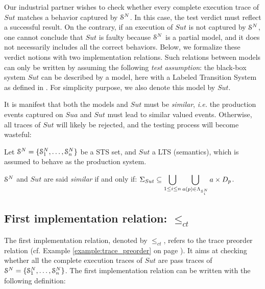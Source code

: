 Our industrial partner wishes to check whether every complete
execution trace of $\mathit{Sut}$ matches a behavior captured by
$\EuScript{S}^{N}$. In this case, the test verdict must reflect a
successful result. On the contrary, if an execution of
$\mathit{Sut}$ is not captured by $\EuScript{S}^{N}$, one cannot
conclude that $\mathit{Sut}$ is faulty because $\EuScript{S}^{N}$
is a partial model, and it does not necessarily includes all the
correct behaviors. Below, we formalize these verdict notions
with two implementation relations. Such relations between models
can only be written by assuming the following \emph{test
assumption}: the black-box system $\mathit{Sut}$ can be described
by a model, here with a Labeled Transition System as defined in
. For
simplicity purpose, we also denote this model by $\mathit{Sut}$.

It is manifest that both the models and $\mathit{Sut}$ must be
\emph{similar}, \emph{i.e.} the production events captured on
$\mathit{Sua}$ and $\mathit{Sut}$ must lead to similar valued
events. Otherwise, all traces of $\mathit{Sut}$ will likely be
rejected, and the testing process will become wasteful:

\begin{definition}
    Let $\EuScript{S}^N = \{ \EuScript{S}_1^N, \dots,
    \EuScript{S}_n^N \}$ be a STS set, and $\mathit{Sut}$ a LTS
    (semantics), which is assumed to behave as the production
    system.

    $\EuScript{S}^N$ and $\mathit{Sut}$ are said \emph{similar}
    if and only if: $\displaystyle\Sigma_{Sut} \subseteq \bigcup_{1 \leq i \leq n}
    \bigcup_{a(p) \in \Lambda_{\EuScript{S}_i^N}} a \times D_p$.

    \label{def:similar-sut-sua}
\end{definition}

\subsection{First implementation relation: $\leq_{ct}$}

The first implementation relation, denoted by $\leq_{ct}$, refers
to the trace preorder relation
\cite{DNH84,vaandrager1991relationship} (cf. Example
\ref{example:trace_preorder} on page
\pageref{example:trace_preorder}).
It aims at checking whether all the complete execution traces of
$\mathit{Sut}$ are pass traces of
$\EuScript{S}^{N}=\{\EuScript{S}_1^{N},\dots,\EuScript{S}_n^{N}\}$.
The first implementation relation can be written with the
following definition:

